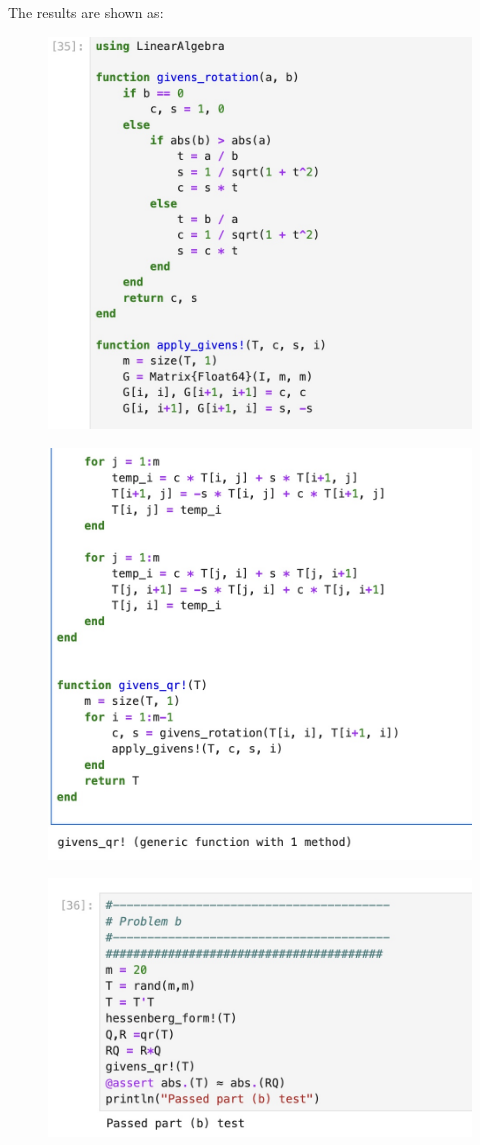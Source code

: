 \documentclass{article}
\begin{document}
The results are shown as:

\begin{figure}[H]
    \centering
    \includegraphics[width=0.75\linewidth]{Image 4-8-24 at 00.00.jpeg}
\end{figure}

\begin{figure}[H]
    \centering
    \includegraphics[width=0.75\linewidth]{Image 4-8-24 at 00.01.jpeg}
\end{figure}

\begin{figure}[H]
    \centering
    \includegraphics[width=0.75\linewidth]{Image 4-8-24 at 00.01 (1).jpeg}   
\end{figure}
\end{document}
